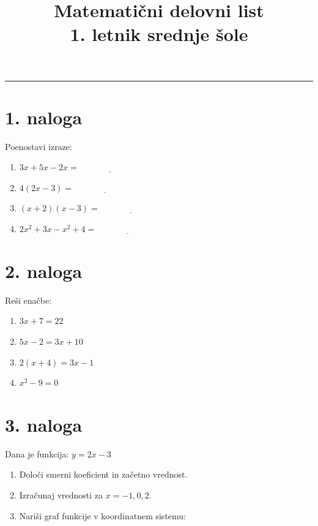\documentclass[a4paper,12pt]{article}
\title{Matematični delovni list \\ \large 1. letnik srednje šole}
\date{}
\begin{document}
\maketitle


\hrule
\vspace{0.5cm}

\section*{1. naloga}
Poenostavi izraze:
\begin{enumerate}
\item $3x + 5x - 2x = \underline{\hspace{3cm}}$
\item $4(2x - 3) = \underline{\hspace{3cm}}$
\item $(x + 2)(x - 3) = \underline{\hspace{3cm}}$
\item $2x^2 + 3x - x^2 + 4 = \underline{\hspace{3cm}}$
\end{enumerate}

\section*{2. naloga}
Reši enačbe:
\begin{enumerate}
\item $3x + 7 = 22$
\item $5x - 2 = 3x + 10$
\item $2(x + 4) = 3x - 1$
\item $x^2 - 9 = 0$
\end{enumerate}

\vspace{2cm}

\section*{3. naloga}
Dana je funkcija: $y = 2x - 3$

\begin{enumerate}
\item Določi smerni koeficient in začetno vrednost.
\item Izračunaj vrednosti za $x = -1, 0, 2$.
\item Nariši graf funkcije v koordinatnem sistemu:
\end{enumerate}

\begin{center}
\end{center}
\end{document}
